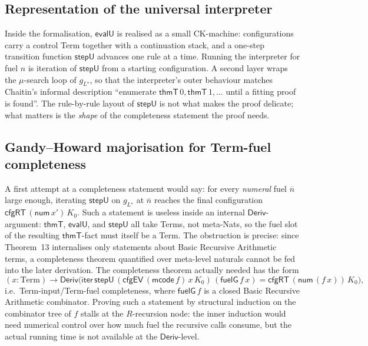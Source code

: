 \documentclass[11pt]{article}
\newcommand{\Term}{\mathrm{Term}}
\newcommand{\Deriv}{\mathsf{Deriv}}
\newcommand{\thmT}{\mathsf{thmT}}
\newcommand{\evalU}{\mathsf{evalU}}
\newcommand{\num}{\mathsf{num}}
\newcommand{\Lstar}{L^{\!\star}}
\begin{document}
\subsection{Representation of the universal interpreter}

Inside the formalisation, $\evalU$ is realised as a small CK-machine:
configurations carry a control Term together with a continuation
stack, and a one-step transition function $\mathsf{stepU}$ advances one
rule at a time. Running the interpreter for fuel $n$ is iteration of
$\mathsf{stepU}$ from a starting configuration. A second layer wraps
the $\mu$-search loop of $g_{\Lstar}$, so that the interpreter's outer
behaviour matches Chaitin's informal description ``enumerate $\thmT\,0,
\thmT\,1, \dots$ until a fitting proof is found''. The rule-by-rule
layout of $\mathsf{stepU}$ is not what makes the proof delicate; what
matters is the \emph{shape} of the completeness statement the proof
needs.

\subsection{Gandy--Howard majorisation for Term-fuel completeness}

A first attempt at a completeness statement would say: for every
\emph{numeral} fuel $\overline{n}$ large enough, iterating
$\mathsf{stepU}$ on $g_{\Lstar}$ at $\overline{n}$ reaches the final
configuration $\mathsf{cfgRT}\,(\num\,x')\,K_0$. Such a statement is
useless inside an internal $\Deriv$-argument: $\thmT$, $\evalU$, and
$\mathsf{stepU}$ all take Terms, not meta-Nats, so the fuel slot of the
resulting $\thmT$-fact must itself be a Term. The obstruction is
precise: since Theorem~13 internalises only statements about Basic Recursive Arithmetic terms,
a completeness theorem quantified over meta-level naturals cannot be
fed into the later derivation. The completeness theorem actually needed
has the form
\[
  (x : \Term) \to \Deriv\bigl(
    \mathsf{iter}\,\mathsf{stepU}\,
      (\mathsf{cfgEV}\,(\mathsf{mcode}\,f)\,x\,K_0)\,
      (\mathsf{fuelG}\,f\,x)
      = \mathsf{cfgRT}\,(\num\,(f\,x))\,K_0
  \bigr),
\]
i.e.\ Term-input/Term-fuel completeness, where $\mathsf{fuelG}\,f$ is a
closed Basic Recursive Arithmetic combinator. Proving such a statement by structural induction
on the combinator tree of $f$ stalls at the $R$-recursion node: the
inner induction would need numerical control over how much fuel the
recursive calls consume, but the actual running time is not available
at the $\Deriv$-level.
\end{document}
